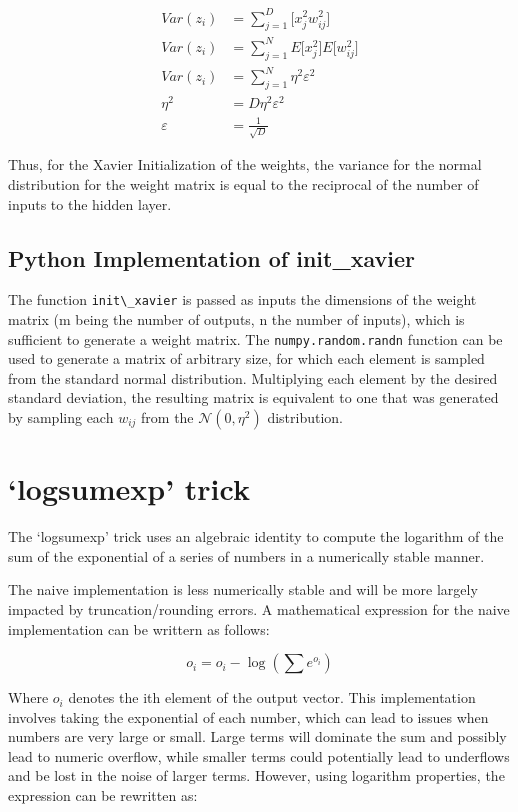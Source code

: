 \documentclass{article}
\begin{document}
\begin{align}
Var(z_i) &= \sum_{j=1}^{D} \Big[x_{j}^2 w_{ij}^2\Big] \\
Var(z_i) & = \sum_{j=1}^{N} E\Big[x_{j}^2\Big] E\Big[w_{ij}^2\Big] \\
Var(z_i) &= \sum_{j=1}^{N} \eta^2 \varepsilon^2 \\
\eta^2 &= D\eta^2 \varepsilon^2 \\
\varepsilon &= \frac{1}{\sqrt{D}}
\end{align}

Thus, for the Xavier Initialization of the weights, the variance for the normal distribution for the weight matrix is equal to the reciprocal of the number of inputs to the hidden layer.

\subsection{Python Implementation of init\_xavier}
The function \verb+init\_xavier+ is passed as inputs the dimensions of the weight matrix (m being the number of outputs, n the number of inputs), which is sufficient to generate a weight matrix. The \verb+numpy.random.randn+ function can be used to generate a matrix of arbitrary size, for which each element is sampled from the standard normal distribution. Multiplying each element by the desired standard deviation, the resulting matrix is equivalent to one that was generated by sampling each $w_{ij}$ from the $\mathcal{N}(0,\eta^2)$ distribution.

\newpage
\section{`logsumexp' trick}
The `logsumexp' trick uses an algebraic identity to compute the logarithm of the sum of the exponential of a series of numbers in a numerically stable manner.

The naive implementation is less numerically stable and will be more largely impacted by truncation/rounding errors. A mathematical expression for the naive implementation can be writtern as follows:

\begin{equation}
o_i = o_i - \log(\sum e^{o_i})
\end{equation}

Where $o_i$ denotes the ith element of the output vector. This implementation involves taking the exponential of each number, which can lead to issues when numbers are very large or small. Large terms will dominate the sum and possibly lead to numeric overflow, while smaller terms could potentially lead to underflows and be lost in the noise of larger terms. However, using logarithm properties, the expression can be rewritten as:
\end{document}
